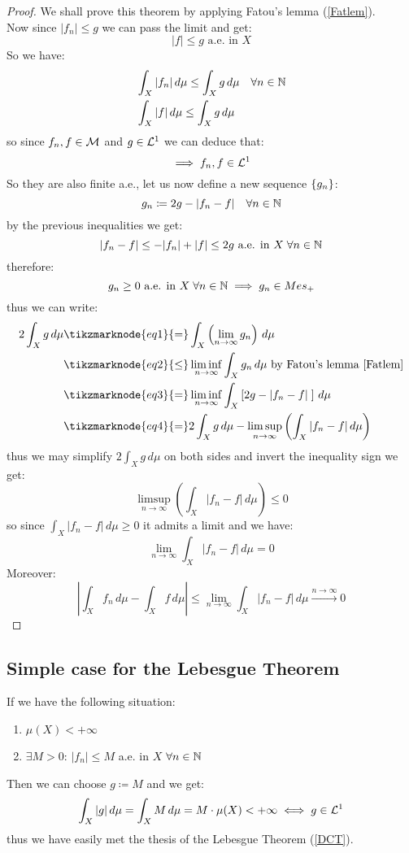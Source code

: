 \begin{proof}
    We shall prove this theorem by applying  Fatou's lemma (\ref{Fatlem}). \\
    Now since $|f_n| \leq g$ we can pass the limit and get:
    \[
        |f| \leq g \text{ a.e. in } X
    \]
    So we have:
    \begin{align*}
        & \int_X |f_n| \, d\mu \leq \int_X g \, d\mu \quad \forall n \in \mathbb{N} \\
        & \int_X |f| \, d\mu \leq \int_X g \, d\mu
    \end{align*}
    so since $f_n,f\in\mathcal{M}$ and $g\in\mathcal{L}^1$ we can deduce that:
    \[
        \implies f_n,f\in\mathcal{L}^1    
    \]
    So they are also finite a.e., let us now define  a new sequence $\{ g_n \}$:
    \[
        g_n \coloneqq 2g - |f_n -f | \quad \forall n \in \mathbb{N}  
    \]
    by the previous inequalities we get:
    \[
        |f_n -f | \leq - |f_n| + |f|\leq 2g \text{ a.e. in } X \; \forall n \in \mathbb{N}    
    \]
    therefore:
    \[
        g_n \geq 0 \text{ a.e. in } X \; \forall n \in \mathbb{N} \implies g_n \in Mes_+    
    \]
    \newpage
    thus we can write:
    \begin{align*}
        2 \int_X g \, d\mu & \tikzmarknode{eq1}{=} \int_X \left( \lim_{n\to\infty} g_n \right) \, d\mu \\
        & \tikzmarknode{eq2}{\leq} \liminf_{n\to\infty} \int_X g_n \, d\mu  \text{ by Fatou's lemma \ref{Fatlem}}\\
        & \tikzmarknode{eq3}{=} \liminf_{n\to\infty} \int_X \left[ 2g - |f_n -f | \; \right] \, d\mu \\
        & \tikzmarknode{eq4}{=} 2 \int_X g \, d\mu - \limsup_{n\to\infty}  \left( \int_X |f_n-f| \, d\mu \right) \\
    \end{align*} 
    thus we may simplify $2\int_X g \, d\mu$ on both sides and invert the inequality sign we get:
    \[
        \limsup_{n\to\infty}  \left( \int_X |f_n-f| \, d\mu \right) \leq 0
    \]
    so since $\int_X |f_n-f| \, d\mu \geq 0$ it admits a limit and we have:
    \[
        \lim_{n\to\infty} \int_X |f_n-f| \, d\mu = 0
    \]
    Moreover:
    \[
        \left| \int_X f_n \, d\mu - \int_X f \, d\mu \right| \leq \lim_{n\to\infty} \int_X |f_n-f| \, d\mu  \xrightarrow{n\to\infty} 0
    \]
\end{proof}

\subsection{Simple case for the Lebesgue Theorem}
If we have the following situation:
\begin{enumerate}
    \item $\mu(X) < + \infty$ 
    \item $\exists M > 0$:  $| f_n | \leq M$ a.e. in $X$ $\forall n \in \mathbb{N}$
\end{enumerate}
Then we can choose $g\coloneqq M$ and we get:
\[
    \int_X |g| \, d\mu = \int_X M \, d\mu = M \cdot \mu(X) < +\infty \iff g\in\mathcal{L}^1    
\]
thus we have easily met the thesis of the Lebesgue Theorem (\ref{DCT}).

